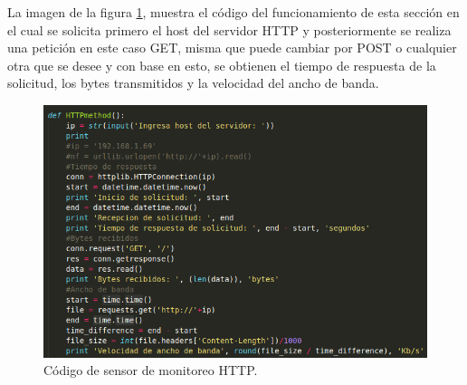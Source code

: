 La imagen de la figura \ref{image:http6}, muestra el código del funcionamiento de esta sección en el cual se solicita primero el host del servidor HTTP y posteriormente se realiza una petición en este caso GET, misma que puede cambiar por POST o cualquier otra que se desee y con base en esto, se obtienen el tiempo de respuesta de la solicitud, los bytes transmitidos y la velocidad del ancho de banda.
\FloatBarrier
\begin{figure}[htbp!]
		\centering
			\includegraphics[width=.75\textwidth]{images/http6}
		\caption{Código de sensor de monitoreo HTTP.}
		\label{image:http6}
\end{figure}
\FloatBarrier
